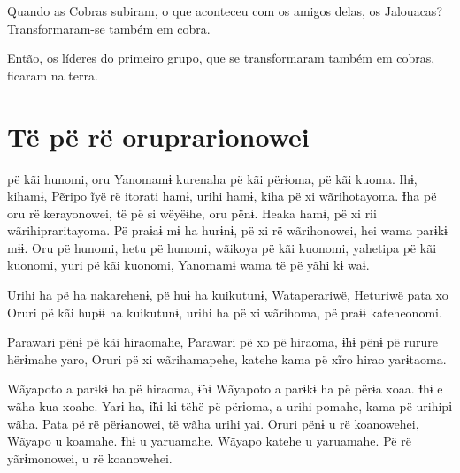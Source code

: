 Quando as Cobras subiram, o que aconteceu com os amigos delas, os
Jalouacas? Transformaram-se também em cobra. 

Então, os líderes do primeiro grupo, que se transformaram também
em cobras, ficaram na terra.

\chapter{Të pë rë oruprarionowei}
 
 pë kãi hunomi, oru Yanomamɨ kurenaha pë kãi përɨoma, pë kãi kuoma.
Ɨhɨ, kihamɨ, Pẽripo ĩyë rë itorati hamɨ, urihi hamɨ, kiha pë xi
wãrihotayoma. Ɨha pë oru rë kerayonowei, të pë si wëyëɨhe, oru pënɨ.
Heaka hamɨ, pë xi rii wãrihipraritayoma. Pë praɨaɨ mɨ ha hurɨnɨ, pë xi
rë wãrihonowei, hei wama parɨkɨ mɨɨ. Oru pë hunomi, hetu pë hunomi,
wãikoya pë kãi kuonomi, yahetipa pë kãi kuonomi, yuri pë kãi kuonomi,
Yanomamɨ wama të pë yãhi kɨ waɨ. 

Urihi ha pë ha nakarehenɨ, pë huɨ ha kuikutunɨ, Wataperariwë, Heturiwë
pata xo Oruri pë kãi hupɨɨ ha kuikutunɨ, urihi ha pë xi wãrihoma, pë
praɨɨ kateheonomi. 



Parawari pënɨ pë kãi hiraomahe, Parawari pë xo pë hiraoma, ɨ̃hɨ pënɨ pë
rurure hërɨmahe yaro, Oruri pë xi wãrihamapehe, katehe kama pë xĩro
hirao yarɨtaoma. 

Wãyapoto a parɨkɨ ha pë hiraoma, ɨ̃hɨ Wãyapoto a parɨkɨ ha pë përɨa xoaa.
Ɨhɨ e wãha kua xoahe. Yarɨ ha, ɨ̃hɨ kɨ tëhë pë përɨoma, a urihi pomahe,
kama pë urihipɨ wãha. Pata pë rë përɨanowei, të wãha urihi yai. Oruri
pënɨ u rë koanowehei, Wãyapo u koamahe. Ɨhɨ u yaruamahe. Wãyapo katehe u
yaruamahe. Pë rë yãrɨmonowei, u rë koanowehei. 

